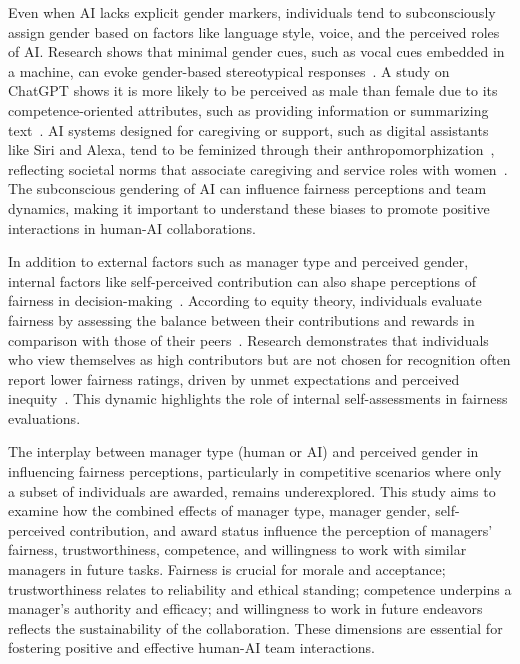 \documentclass{article}
\begin{document}
Even when AI lacks explicit gender markers, individuals tend to subconsciously assign gender based on factors like language style, voice, and the perceived roles of AI. 
Research shows that minimal gender cues, such as vocal cues embedded in a machine, can evoke gender-based stereotypical responses~\cite{nass1997machines}.
A study on ChatGPT shows it is more likely to be perceived as male than female due to its competence-oriented attributes, such as providing information or summarizing text~\cite{wong2023chatgpt}. 
AI systems designed for caregiving or support, such as digital assistants like Siri and Alexa, tend to be feminized through their anthropomorphization~\cite{costa2018conversing}, reflecting societal norms that associate caregiving and service roles with women~\cite{costa2019ai}. 
The subconscious gendering of AI can influence fairness perceptions and team dynamics, making it important to understand these biases to promote positive interactions in human-AI collaborations.

In addition to external factors such as manager type and perceived gender, internal factors like self-perceived contribution can also shape perceptions of fairness in decision-making~\cite{guo2014neural}.
According to equity theory, individuals evaluate fairness by assessing the balance between their contributions and rewards in comparison with those of their peers~\cite{adams1963towards}.
Research demonstrates that individuals who view themselves as high contributors but are not chosen for recognition often report lower fairness ratings, driven by unmet expectations and perceived inequity~\cite{adams1965inequity}. This dynamic highlights the role of internal self-assessments in fairness evaluations. 

The interplay between manager type (human or AI) and perceived gender in influencing fairness perceptions, particularly in competitive scenarios where only a subset of individuals are awarded, remains underexplored.
This study aims to examine how the combined effects of manager type, manager gender, self-perceived contribution, and award status influence the perception of managers' fairness, trustworthiness, competence, and willingness to work with similar managers in future tasks. Fairness is crucial for morale and acceptance; trustworthiness relates to reliability and ethical standing; competence underpins a manager’s authority and efficacy; and willingness to work in future endeavors reflects the sustainability of the collaboration. These dimensions are essential for fostering positive and effective human-AI team interactions.
\end{document}
